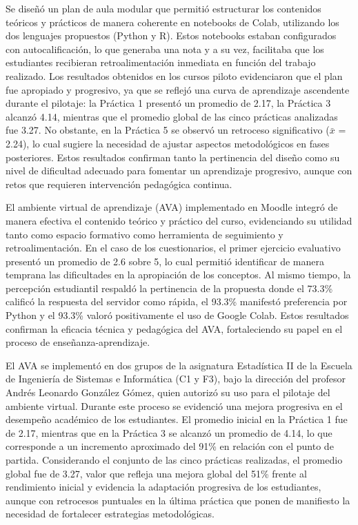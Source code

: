 \documentclass[letter,oneside,12pt,spanish]{report}
\begin{document}
Se diseñó un plan de aula modular que permitió estructurar los contenidos teóricos y prácticos de manera coherente en notebooks de Colab, utilizando los dos lenguajes propuestos (Python y R). Estos notebooks estaban configurados con autocalificación, lo que generaba una nota y a su vez, facilitaba que los estudiantes recibieran retroalimentación inmediata en función del trabajo realizado. Los resultados obtenidos en los cursos piloto evidenciaron que el plan fue apropiado y progresivo, ya que se reflejó una curva de aprendizaje ascendente durante el pilotaje: la Práctica 1 presentó un promedio de 2.17, la Práctica 3 alcanzó 4.14, mientras que el promedio global de las cinco prácticas analizadas fue 3.27. No obstante, en la Práctica 5 se observó un retroceso significativo ($\bar{x}$ = 2.24), lo cual sugiere la necesidad de ajustar aspectos metodológicos en fases posteriores. Estos resultados confirman tanto la pertinencia del diseño como su nivel de dificultad adecuado para fomentar un aprendizaje progresivo, aunque con retos que requieren intervención pedagógica continua.

El ambiente virtual de aprendizaje (AVA) implementado en Moodle integró de manera efectiva el contenido teórico y práctico del curso, evidenciando su utilidad tanto como espacio formativo como herramienta de seguimiento y retroalimentación. En el caso de los cuestionarios, el primer ejercicio evaluativo presentó un promedio de 2.6 sobre 5, lo cual permitió identificar de manera temprana las dificultades en la apropiación de los conceptos. Al mismo tiempo, la percepción estudiantil respaldó la pertinencia de la propuesta donde el 73.3\% calificó la respuesta del servidor como rápida, el 93.3\% manifestó preferencia por Python y el 93.3\% valoró positivamente el uso de Google Colab. Estos resultados confirman la eficacia técnica y pedagógica del AVA, fortaleciendo su papel en el proceso de enseñanza-aprendizaje.

El AVA se implementó en dos grupos de la asignatura Estadística II de la Escuela de Ingeniería de Sistemas e Informática (C1 y F3), bajo la dirección del profesor Andrés Leonardo González Gómez, quien autorizó su uso para el pilotaje del ambiente virtual. Durante este proceso se evidenció una mejora progresiva en el desempeño académico de los estudiantes. El promedio inicial en la Práctica 1 fue de 2.17, mientras que en la Práctica 3 se alcanzó un promedio de 4.14, lo que corresponde a un incremento aproximado del 91\% en relación con el punto de partida. Considerando el conjunto de las cinco prácticas realizadas, el promedio global fue de 3.27, valor que refleja una mejora global del 51\% frente al rendimiento inicial y evidencia la adaptación progresiva de los estudiantes, aunque con retrocesos puntuales en la última práctica que ponen de manifiesto la necesidad de fortalecer estrategias metodológicas.
\end{document}
